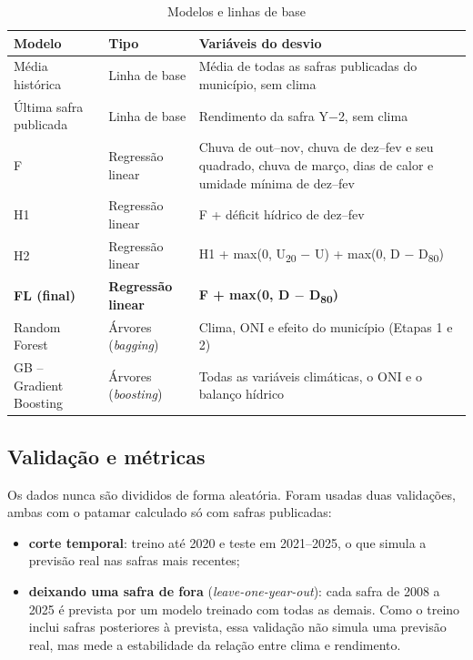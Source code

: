\documentclass[
	article,			%
	11pt,				%
	oneside,			%
	a4paper,			%
	english,			%
	brazil,				%
	sumario=tradicional
	]{abntex2}
\begin{document}
\begin{table}[htbp]
\centering
\caption{Modelos e linhas de base}
\label{tab:modelos}
\small
\begin{tabular}{|>{\raggedright\arraybackslash}p{3.19cm}|>{\raggedright\arraybackslash}p{2.82cm}|>{\raggedright\arraybackslash}p{7.33cm}|}
\hline
\textbf{Modelo} & \textbf{Tipo} & \textbf{Variáveis do desvio} \\ \hline
Média histórica & Linha de base & Média de todas as safras publicadas do município, sem clima \\ \hline
Última safra publicada & Linha de base & Rendimento da safra Y$-$2, sem clima \\ \hline
F & Regressão linear & Chuva de out--nov, chuva de dez--fev e seu quadrado, chuva de março, dias de calor e umidade mínima de dez--fev \\ \hline
H1 & Regressão linear & F + déficit hídrico de dez--fev \\ \hline
H2 & Regressão linear & H1 + max(0, U\textsubscript{20} $-$ U) + max(0, D $-$ D\textsubscript{80}) \\ \hline
\textbf{FL (final)} & \textbf{Regressão linear} & \textbf{F + max(0, D $-$ D\textsubscript{80})} \\ \hline
Random Forest & Árvores (\emph{bagging}) & Clima, ONI e efeito do município (Etapas 1 e 2) \\ \hline
GB -- Gradient Boosting & Árvores (\emph{boosting}) & Todas as variáveis climáticas, o ONI e o balanço hídrico \\ \hline
\end{tabular}
\end{table}

\subsection{Validação e métricas}

Os dados nunca são divididos de forma aleatória. Foram usadas duas validações, ambas com o patamar calculado só com safras publicadas:

\begin{itemize}
\item \textbf{corte temporal}: treino até 2020 e teste em 2021--2025, o que simula a previsão real nas safras mais recentes;
\item \textbf{deixando uma safra de fora} (\emph{leave-one-year-out}): cada safra de 2008 a 2025 é prevista por um modelo treinado com todas as demais. Como o treino inclui safras posteriores à prevista, essa validação não simula uma previsão real, mas mede a estabilidade da relação entre clima e rendimento.
\end{itemize}
\end{document}
